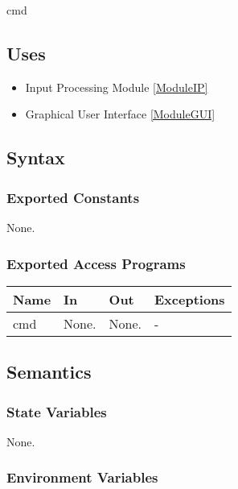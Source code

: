 \documentclass[12pt, titlepage]{article}
\begin{document}
cmd

\subsection{Uses}

\begin{itemize}
  \item Input Processing Module \ref{ModuleIP}
  \item Graphical User Interface \ref{ModuleGUI}
\end{itemize}



\subsection{Syntax}

\subsubsection{Exported Constants}

None.

\subsubsection{Exported Access Programs}

\begin{center}
\begin{tabular}{p{2cm} p{4cm} p{4cm} p{2cm}}
\hline
\textbf{Name} & \textbf{In} & \textbf{Out} & \textbf{Exceptions} \\
\hline
cmd & None. & None. & - \\
\hline
\end{tabular}
\end{center}

\subsection{Semantics}

\subsubsection{State Variables}

None.

\subsubsection{Environment Variables}
\end{document}
